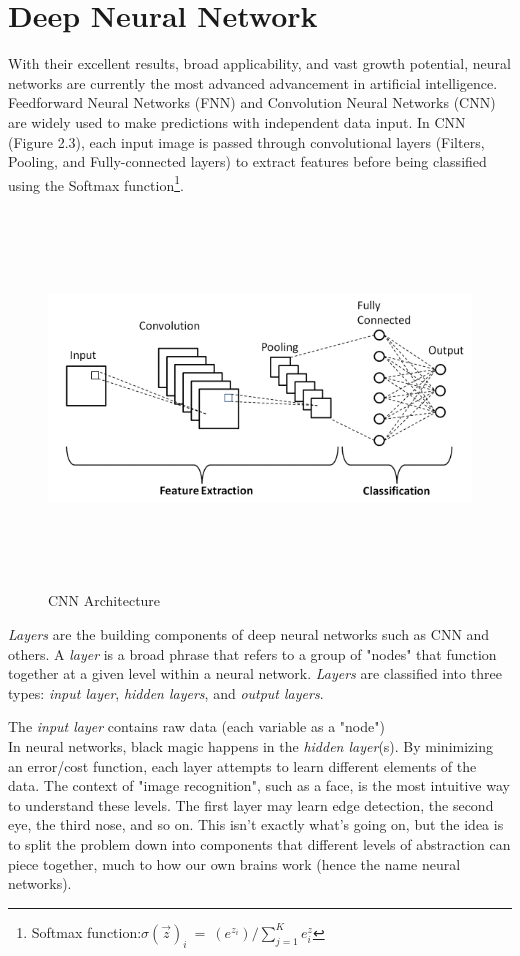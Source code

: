 \section{Deep Neural Network}
\label{sec:deep_neural_network}
With their excellent results, broad applicability, and vast growth potential, neural networks are currently the most advanced advancement in artificial intelligence. Feedforward Neural Networks (FNN) and Convolution Neural Networks (CNN) are widely used to make predictions with independent data input. In CNN (Figure 2.3), each input image is passed through convolutional layers (Filters, Pooling, and Fully-connected layers) to extract features before being classified using the Softmax function\footnote{Softmax function:$ \sigma (\overrightarrow{z})_i \: = \: (e^{z_i})/ \sum_{j=1}^{K} e^z_i  $}.
\begin{figure}[h!]
	\centering
	\includegraphics[width=\linewidth, height=10cm,keepaspectratio]{figures/CNN.png}
	\caption{CNN Architecture}
\end{figure}	

\emph{Layers} are the building components of deep neural networks such as CNN and others. A \emph{layer} is a broad phrase that refers to a group of "nodes" that function together at a given level within a neural network. \emph{Layers} are classified into three types: \emph{input layer},\emph{ hidden layers}, and \emph{output layers}.

The \emph{input layer} contains raw data (each variable as a "node") \\
In neural networks, black magic happens in the \emph{hidden layer}(s). By minimizing an error/cost function, each layer attempts to learn different elements of the data. The context of "image recognition", such as a face, is the most intuitive way to understand these levels. The first layer may learn edge detection, the second eye, the third nose, and so on. This isn't exactly what's going on, but the idea is to split the problem down into components that different levels of abstraction can piece together, much to how our own brains work (hence the name neural networks).

